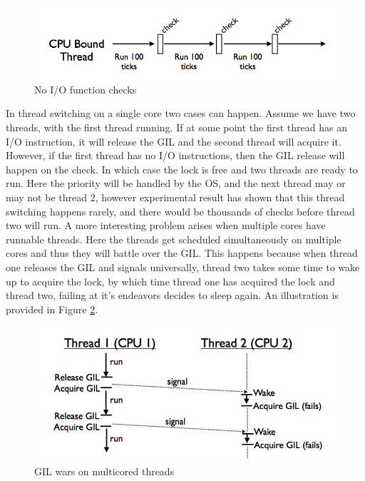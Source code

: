 \documentclass[10pt,twocolumn,letterpaper]{article}
\begin{document}
\begin{figure}[htbp] 
\begin{center}
\includegraphics[scale=0.3]{figure/threads_check.png}
\end{center}
\caption{No I/O function checks}
\label{fig:No-I/O-function}
\end{figure}


In thread switching on a single core two cases can happen. Assume
we have two threads, with the first thread running. If at some point
the first thread has an I/O instruction, it will release the GIL and
the second thread will acquire it. However, if the first thread has
no I/O instructions, then the GIL release will happen on the check.
In which case the lock is free and two threads are ready to run. Here
the priority will be handled by the OS, and the next thread may or
may not be thread 2, however experimental result has shown that this
thread switching happens rarely, and there would be thousands of checks
before thread two will run. A more interesting problem arises when
multiple cores have runnable threads. Here the threads get scheduled
simultaneously on multiple cores and thus they will battle over the
GIL. This happens because when thread one releases the GIL and signals
universally, thread two takes some time to wake up to acquire the
lock, by which time thread one has acquired the lock and thread two,
failing at it's endeavors decides to sleep again. An illustration
is provided in Figure \ref{fig:GIL-wars-on}.

\begin{figure}[htbp] 
\begin{center}
\includegraphics[scale=0.3]{figure/threads_multicore.png}
\end{center}
\caption{GIL wars on multicored threads}
\label{fig:GIL-wars-on}
\end{figure}
\end{document}
